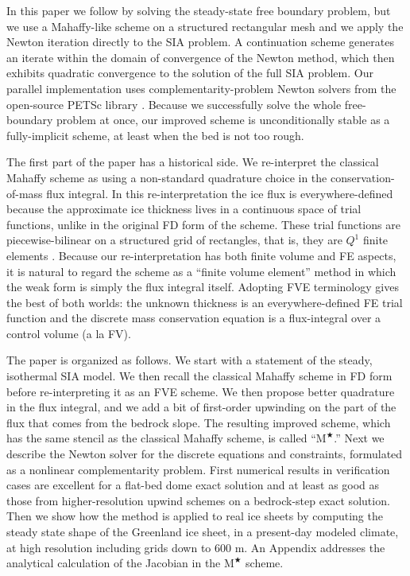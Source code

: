 \documentclass[twocolumn,a4paper]{igs}
\newcommand{\Mstar}{$\text{M}^{\bigstar}$\xspace}
\begin{document}
In this paper we follow \cite{JouvetBueler2012} by solving the steady-state free boundary problem, but we use a Mahaffy-like scheme on a structured rectangular mesh and we apply the Newton iteration directly to the SIA problem.  A continuation scheme generates an iterate within the domain of convergence of the Newton method, which then exhibits quadratic convergence to the solution of the full SIA problem.  Our parallel implementation uses complementarity-problem Newton solvers \citep{BensonMunson2006} from the open-source PETSc library \citep{Balayetal2014}.  Because we successfully solve the whole free-boundary problem at once, our improved scheme is unconditionally stable as a fully-implicit scheme, at least when the bed is not too rough.

The first part of the paper has a historical side.  We re-interpret the classical Mahaffy scheme as using a non-standard quadrature choice in the conservation-of-mass flux integral.  In this re-interpretation the ice flux is everywhere-defined because the approximate ice thickness lives in a continuous space of trial functions, unlike in the original FD form of the scheme.  These trial functions are piecewise-bilinear on a structured grid of rectangles, that is, they are $Q^1$ finite elements \citep{Elmanetal2005}.  Because our re-interpretation has both finite volume \citep[FV;][]{LeVeque2002} and FE aspects, it is natural to regard the scheme as a ``finite volume element'' method \citep[FVE;][]{Cai1990,EwingLinLin2002} in which the weak form is simply the flux integral itself.  Adopting FVE terminology gives the best of both worlds: the unknown thickness is an everywhere-defined FE trial function and the discrete mass conservation equation is a flux-integral over a control volume (a la FV).

The paper is organized as follows.  We start with a statement of the steady, isothermal SIA model.  We then recall the classical Mahaffy scheme in FD form before re-interpreting it as an FVE scheme.  We then propose better quadrature in the flux integral, and we add a bit of first-order upwinding on the part of the flux that comes from the bedrock slope.  The resulting improved scheme, which has the same stencil as the classical Mahaffy scheme, is called ``\Mstar.''  Next we describe the Newton solver for the discrete equations and constraints, formulated as a nonlinear complementarity problem.  First numerical results in verification cases are excellent for a flat-bed dome exact solution and at least as good as those from higher-resolution upwind schemes on a bedrock-step exact solution.  Then we show how the method is applied to real ice sheets by computing the steady state shape of the Greenland ice sheet, in a present-day modeled climate, at high resolution including grids down to 600 m.  An Appendix addresses the analytical calculation of the Jacobian in the \Mstar scheme.
\end{document}
